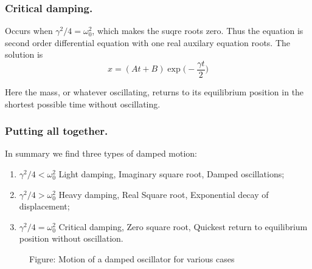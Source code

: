 \documentclass[../../main.tex]{subfiles}
\begin{document}
\subsubsection{Critical damping.} Occurs when $\gamma^2/4 = \omega_0^2$, which makes the suqre roots zero. Thus the equation is second order differential equation with one real auxilary equation roots. The solution is
\begin{equation*}
    x=(At+B)\exp\biggl(-\frac{\gamma t}{2}\biggr)
\end{equation*}

Here the mass, or whatever oscillating, returns to its equilibrium position in the shortest possible time without oscillating. 

\subsubsection{Putting all together.} In summary we find three types of damped motion:
\begin{enumerate}
    \item $\gamma^2/4<\omega_0^2$ Light damping, Imaginary square root, Damped oscillations;
    \item $\gamma^2/4>\omega_0^2$ Heavy damping, Real Square root, Exponential decay of displacement;
    \item $\gamma^2/4=\omega_0^2$ Critical damping, Zero square root, Quickest return to equilibrium position without oscillation.
\end{enumerate} 
\begin{figure}[h]
    \centering
    \caption*{Figure: Motion of a damped oscillator for various cases}
\end{figure}
\end{document}
